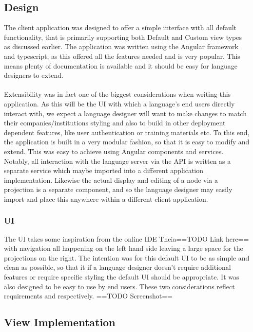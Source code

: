 \documentclass{report}
\begin{document}
\subsection{Design}
The client application was designed to offer a simple interface with all default functionality, that is primarily  supporting both Default and Custom view types as discussed earlier. The application was written using the Angular framework and typescript, as this offered all the features needed and is very popular. This means plenty of documentation is available and it should be easy for language designers to extend.
\\
\\
Extensibility was in fact one of the biggest considerations when writing this application. As this will be the UI with which a language's end users directly interact with, we expect a language designer will want to make changes to match their companies/institutions styling and also to build in other  deployment dependent features, like user authentication or training materials etc. To this end, the application is built in a very modular fashion, so that it is easy to modify and extend. This was easy to achieve using Angular components and services. Notably, all interaction with the language server via the API is written as a separate service which maybe imported into a different application implementation. Likewise the actual display and editing of a node via a projection is a separate component, and so the language designer may easily import and place this anywhere within a different client application.
\subsubsection{UI}
The UI takes some inspiration from the online IDE Theia==TODO Link here== with navigation all happening on the left hand side leaving a large space for the projections on the right. The intention was for this default UI to be as simple and clean as possible, so that it if a language designer doesn't require additional features or require specific styling the default UI should be appropriate. It was also designed to be easy to use by end users. These two considerations reflect requirements \RSetup and \RIntuitive respectively.
==TODO Screenshot==


\subsection{View Implementation}
\end{document}
